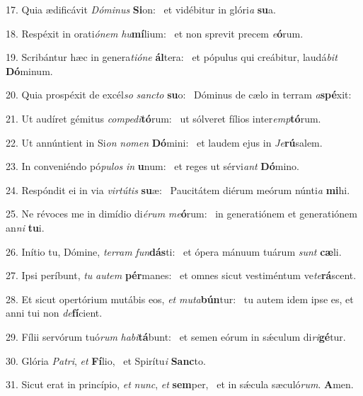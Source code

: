 17. Quia ædificávit \textit{Dó}\textit{mi}\textit{nus} \textbf{Si}on: \ast\  et vidébitur in glóri\textit{a} \textbf{su}a.\

18. Respéxit in orati\textit{ó}\textit{nem} \textit{hu}\textbf{mí}lium: \ast\  et non sprevit precem \textit{e}\textbf{ó}rum.\

19. Scribántur hæc in genera\textit{ti}\textit{ó}\textit{ne} \textbf{ál}tera: \ast\  et pópulus qui creábitur, laudá\textit{bit} \textbf{Dó}minum.\

20. Quia prospéxit de excél\textit{so} \textit{sanc}\textit{to} \textbf{su}o: \ast\  Dóminus de cælo in terram \textit{a}\textbf{spé}xit:\

21. Ut audíret gémitus \textit{com}\textit{pe}\textit{di}\textbf{tó}rum: \ast\  ut sólveret fílios inter\textit{emp}\textbf{tó}rum.\

22. Ut annúntient in Si\textit{on} \textit{no}\textit{men} \textbf{Dó}mini: \ast\  et laudem ejus in \textit{Je}\textbf{rú}salem.\

23. In conveniéndo pó\textit{pu}\textit{los} \textit{in} \textbf{u}num: \ast\  et reges ut sérvi\textit{ant} \textbf{Dó}mino.\

24. Respóndit ei in via \textit{vir}\textit{tú}\textit{tis} \textbf{su}æ: \ast\  Paucitátem diérum meórum núnti\textit{a} \textbf{mi}hi.\

25. Ne révoces me in dimídio di\textit{é}\textit{rum} \textit{me}\textbf{ó}rum: \ast\  in generatiónem et generatiónem an\textit{ni} \textbf{tu}i.\

26. Inítio tu, Dómine, \textit{ter}\textit{ram} \textit{fun}\textbf{dás}ti: \ast\  et ópera mánuum tuárum \textit{sunt} \textbf{cæ}li.\

27. Ipsi períbunt, \textit{tu} \textit{au}\textit{tem} \textbf{pér}manes: \ast\  et omnes sicut vestiméntum ve\textit{te}\textbf{rá}scent.\

28. Et sicut opertórium mutábis eos, \textit{et} \textit{mu}\textit{ta}\textbf{bún}tur: \ast\  tu autem idem ipse es, et anni tui non \textit{de}\textbf{fí}cient.\

29. Fílii servórum tuó\textit{rum} \textit{ha}\textit{bi}\textbf{tá}bunt: \ast\  et semen eórum in sǽculum di\textit{ri}\textbf{gé}tur.\

30. Glória \textit{Pa}\textit{tri}, \textit{et} \textbf{Fí}lio, \ast\  et Spirítu\textit{i} \textbf{Sanc}to.\

31. Sicut erat in princípio, \textit{et} \textit{nunc}, \textit{et} \textbf{sem}per, \ast\  et in sǽcula sæculó\textit{rum}. \textbf{A}men.\

